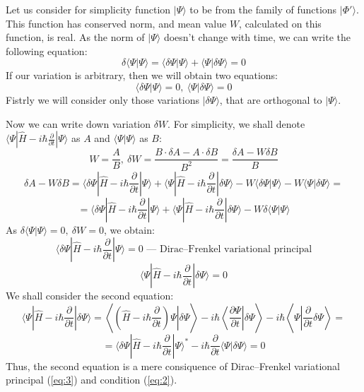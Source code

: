 \documentclass[a4paper,14pt]{extarticle}
\begin{document}
Let us consider for simplicity function $|\Psi\rangle$ to be from the family of functions $|\Phi'\rangle$. 
This function has conserved norm, and mean value $W$, calculated on this function, is real.
As the norm of $|\Psi\rangle$ doesn't change with time, we can write the following equation:
\begin{equation}
\delta\langle\Psi|\Psi\rangle = \langle\delta\Psi|\Psi\rangle+\langle\Psi|\delta\Psi\rangle=0
\label{eq:2}
\end{equation}
If our variation is arbitrary, then we will obtain two equations:
$$\langle\delta\Psi|\Psi\rangle=0,\ \langle\Psi|\delta\Psi\rangle=0$$
Fistrly we will consider only those variations $|\delta\Psi\rangle$, that are orthogonal to $|\Psi\rangle$.

Now we can write down variation $\delta W$. 
For simplicity, we shall denote $\langle\Psi|\hat{H}-i\hbar\frac{\partial}{\partial t}|\Psi\rangle$ as $A$ 
and $\langle\Psi|\Psi\rangle$ as $B$:
$$W = \frac{A}{B},\ \delta W = \frac{B\cdot\delta A - A\cdot\delta B}{B^2}=\frac{\delta A - W\delta B}{B}$$
$$\delta A - W\delta B = \langle\delta\Psi|\hat{H}-i\hbar\frac{\partial}{\partial t}|\Psi\rangle + %
			 \langle\Psi|\hat{H}-i\hbar\frac{\partial}{\partial t}|\delta\Psi\rangle - 
			 W\langle\delta\Psi|\Psi\rangle - W\langle\Psi|\delta\Psi\rangle = $$
$$ = \langle\delta\Psi|\hat{H}-i\hbar\frac{\partial}{\partial t}|\Psi\rangle + %
     \langle\Psi|\hat{H}-i\hbar\frac{\partial}{\partial t}|\delta\Psi\rangle - W\delta\langle\Psi|\Psi\rangle$$
As $\delta\langle\Psi|\Psi\rangle=0,\ \delta W = 0$, we obtain:
\begin{equation}
\langle\delta\Psi|\hat{H}-i\hbar\frac{\partial}{\partial t}|\Psi\rangle = 0\text{ --- Dirac--Frenkel variational principal}
\label{eq:3}
\end{equation}
$$\langle\Psi|\hat{H}-i\hbar\frac{\partial}{\partial t}|\delta\Psi\rangle = 0$$
We shall consider the second equation:
$$\langle\Psi|\hat{H}-i\hbar\frac{\partial}{\partial t}|\delta\Psi\rangle = %
  \left\langle\left.\left(\hat{H}-i\hbar\frac{\partial}{\partial t}\right)\Psi\right|\delta\Psi\right\rangle-%
  i\hbar\left.\left\langle\frac{\partial\Psi}{\partial t}\right|\delta\Psi\right\rangle-%
  i\hbar\left\langle\Psi\left|\frac{\partial}{\partial t}\delta\Psi\right\rangle\right.=$$
$$=\langle\delta\Psi|\hat{H}-i\hbar\frac{\partial}{\partial t}|\Psi\rangle^* -%
   i\hbar\frac{\partial}{\partial t}\langle\Psi|\delta\Psi\rangle = 0$$
Thus, the second equation is a mere consiquence of Dirac--Frenkel variational principal (\ref{eq:3}) and condition (\ref{eq:2}).
\end{document}
